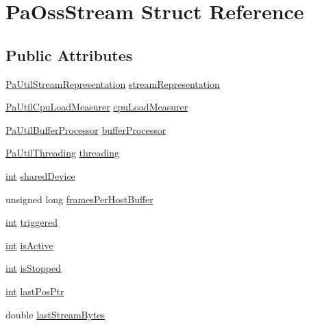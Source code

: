 \hypertarget{struct_pa_oss_stream}{}\section{Pa\+Oss\+Stream Struct Reference}
\label{struct_pa_oss_stream}
\subsection*{Public Attributes}
\begin{DoxyCompactItemize}
\item 
\hyperlink{struct_pa_util_stream_representation}{Pa\+Util\+Stream\+Representation} \hyperlink{struct_pa_oss_stream_a0d731c9d8936b9303931b5c5fbc40f7e}{stream\+Representation}
\item 
\hyperlink{struct_pa_util_cpu_load_measurer}{Pa\+Util\+Cpu\+Load\+Measurer} \hyperlink{struct_pa_oss_stream_aa62961e9043374ae1517162fcdeec84d}{cpu\+Load\+Measurer}
\item 
\hyperlink{struct_pa_util_buffer_processor}{Pa\+Util\+Buffer\+Processor} \hyperlink{struct_pa_oss_stream_a0b2602b258a473831c538c58b568a0f6}{buffer\+Processor}
\item 
\hyperlink{struct_pa_util_threading}{Pa\+Util\+Threading} \hyperlink{struct_pa_oss_stream_abed200ca0a101d18139b4773d41526f6}{threading}
\item 
\hyperlink{xmltok_8h_a5a0d4a5641ce434f1d23533f2b2e6653}{int} \hyperlink{struct_pa_oss_stream_a07e910fb0e37c6edd896bb26652f2731}{shared\+Device}
\item 
unsigned long \hyperlink{struct_pa_oss_stream_a0f4eb82448f8ed9c9fbb6637c864d61c}{frames\+Per\+Host\+Buffer}
\item 
\hyperlink{xmltok_8h_a5a0d4a5641ce434f1d23533f2b2e6653}{int} \hyperlink{struct_pa_oss_stream_abd3e8fb7cc3560fda0f0827055058915}{triggered}
\item 
\hyperlink{xmltok_8h_a5a0d4a5641ce434f1d23533f2b2e6653}{int} \hyperlink{struct_pa_oss_stream_ae0985c22b9f0382faede4f48cd2071ea}{is\+Active}
\item 
\hyperlink{xmltok_8h_a5a0d4a5641ce434f1d23533f2b2e6653}{int} \hyperlink{struct_pa_oss_stream_a3c19a7322bb3dc1426ee448c821724bc}{is\+Stopped}
\item 
\hyperlink{xmltok_8h_a5a0d4a5641ce434f1d23533f2b2e6653}{int} \hyperlink{struct_pa_oss_stream_ab6ce13dd52a50ff036c85bddb0259859}{last\+Pos\+Ptr}
\item 
double \hyperlink{struct_pa_oss_stream_a90d0de71db73bc00497e7a2fce9c2ce4}{last\+Stream\+Bytes}

\end{DoxyCompactItemize}
